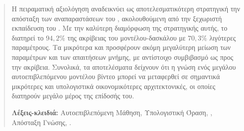 \begin{abstract}
Η πειραματική αξιολόγηση αναδεικνύει ως αποτελεσματικότερη στρατηγική
την απόσταξη των αναπαραστάσεων του , ακολουθούμενη από
την ξεχωριστή εκπαίδευση του .
Με την καλύτερη διαμόρφωση της στρατηγικής
αυτής, το  διατηρεί το \(94{,}2\%\) της ακρίβειας του
μοντέλου-δασκάλου με \(70{,}3\%\) λιγότερες παραμέτρους. Τα μικρότερα
 και  προσφέρουν ακόμη μεγαλύτερη μείωση των
παραμέτρων και των απαιτήσεων μνήμης, με αντίστοιχο συμβιβασμό ως προς
την ακρίβεια. Συνολικά, τα αποτελέσματα δείχνουν ότι η γνώση ενός
μεγάλου αυτοεπιβλεπόμενου μοντέλου βίντεο μπορεί να μεταφερθεί σε
σημαντικά μικρότερες και υπολογιστικά οικονομικότερες αρχιτεκτονικές,
οι οποίες διατηρούν μεγάλο μέρος της επίδοσής του.

\noindent\textbf{Λέξεις-κλειδιά:} Αυτοεπιβλεπόμενη Μάθηση, Υπολογιστική Όραση, , Απόσταξη Γνώσης, .
\end{abstract}

